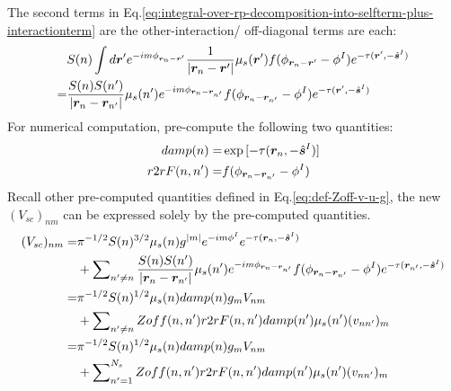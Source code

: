 \documentclass [10pt,letterpaper]{article}
\renewcommand{\vec}{\vectorsym}
\newcommand{\unitvec}[1]{\hat{\vec{#1}}}
\begin{document}
The second terms in Eq.\eqref{eq:integral-over-rp-decomposition-into-selfterm-plus-interactionterm} are the other-interaction/ off-diagonal terms are each:
\begin{equation} \label{eq:result-off-diagonal-Vscnm-1pt}
	\begin{split} 
		&
		S(n)
		\int d\vec{r}^\prime
		e^{-i m \phi_{\vec{r}_n-\vec{r}^\prime}}
		\frac
		{1}
		{\lvert \vec{r}_n-\vec{r}^\prime \rvert}
		\mu_s(\vec{r}^\prime)
		f(\phi_{\vec{r}_n-\vec{r}^\prime}-\phi^I)
		e^{-\tau(\vec{r}^\prime,-\unitvec{s}^I)} 
		\\
		=&
		\frac
		{S(n)S(n^\prime)}
		{\lvert \vec{r}_n - \vec{r}_{n^\prime} \rvert} 
		\mu_s(n^\prime)
		e^{-i m \phi_{\vec{r}_n - \vec{r}_{n^\prime}}}
		f(\phi_{\vec{r}_n - \vec{r}_{n^\prime}}-\phi^I)
		e^{-\tau(\vec{r}^\prime,-\unitvec{s}^I)}
	\end{split}
\end{equation}
For numerical computation, pre-compute the following two quantities:
\begin{subequations} \label{eq:def-damp-r2rF} 
	\begin{align}
		damp(n)
		=&
		\exp
		{
			[-\tau(\vec{r}_n,-\unitvec{s}^I)]
		}
		\label{eq:def-tau}
		\\
		r2rF(n,n^\prime)
		=&
		f(\phi_{\vec{r}_n-\vec{r}_{n^\prime}} - \phi^I)
		\label{eq:def-r2rR}
	\end{align} 
\end{subequations}
Recall other pre-computed quantities defined in Eq.\eqref{eq:def-Zoff-v-u-g}, the new $(V_{sc})_{n m}$ can be expressed solely by the pre-computed quantities.
\begin{equation} \label{eq:result-Vscnm-1pt}
	\begin{split} 
		(V_{sc})_{n m}
		=&
		\pi^{-1/2}
		S(n)^{3/2}
		\mu_s(n)
		g^{\lvert m \rvert}
		e^{-i m \phi^I }
		e^{-\tau(\vec{r}_n,-\unitvec{s}^I)} 
		\\
		&+
		\sum \nolimits_{n^\prime \neq n}
		\frac
		{S(n)S(n^\prime)}
		{\lvert \vec{r}_n - \vec{r}_{n^\prime} \rvert} 
		\mu_s(n^\prime)
		e^{-i m \phi_{\vec{r}_n - \vec{r}_{n^\prime}}}
		f(\phi_{\vec{r}_n - \vec{r}_{n^\prime}}-\phi^I)
		e^{-\tau(\vec{r}_{n^\prime},-\unitvec{s}^I)} 
		\\
		=&
		\pi^{-1/2}
		S(n)^{1/2}
		\mu_s(n)
		damp(n)
		g_m
		V_{n m}
		\\
		&+
		\sum \nolimits_{n^\prime \neq n}
		Zoff(n,n^\prime)
		r2rF(n,n^\prime)
		damp(n^\prime)
		\mu_s(n^\prime)
		(v_{n n^\prime})_m
		\\
		=&
		\pi^{-1/2}
		S(n)^{1/2}
		\mu_s(n)
		damp(n)
		g_m
		V_{n m}
		\\
		&+
		\sum \nolimits_{n^\prime=1}^{N_s}
		Zoff(n,n^\prime)
		r2rF(n,n^\prime)
		damp(n^\prime)
		\mu_s(n^\prime)
		(v_{n n^\prime})_m
	\end{split}
\end{equation}
\end{document}
